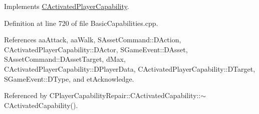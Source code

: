 Implements \hyperlink{classCActivatedPlayerCapability_a943b5999a57504399293250382c0ec6a}{C\+Activated\+Player\+Capability}.



Definition at line 720 of file Basic\+Capabilities.\+cpp.



References aa\+Attack, aa\+Walk, S\+Asset\+Command\+::\+D\+Action, C\+Activated\+Player\+Capability\+::\+D\+Actor, S\+Game\+Event\+::\+D\+Asset, S\+Asset\+Command\+::\+D\+Asset\+Target, d\+Max, C\+Activated\+Player\+Capability\+::\+D\+Player\+Data, C\+Activated\+Player\+Capability\+::\+D\+Target, S\+Game\+Event\+::\+D\+Type, and et\+Acknowledge.



Referenced by C\+Player\+Capability\+Repair\+::\+C\+Activated\+Capability\+::$\sim$\+C\+Activated\+Capability().


